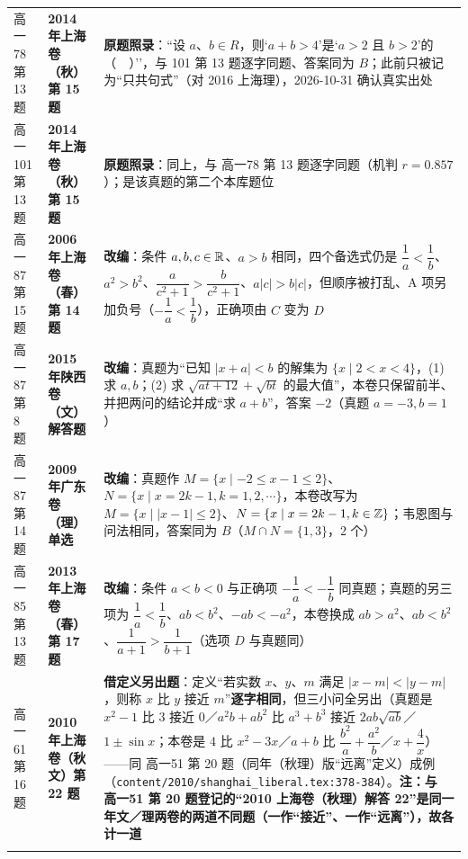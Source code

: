 \documentclass[a4paper,11pt]{article}
\begin{document}
\begin{xltabular}{\textwidth}{@{}>{\raggedright\arraybackslash}p{2.85cm}>{\raggedright\arraybackslash}p{3.99cm}>{\raggedright\arraybackslash}p{7.89cm}@{}}
高一78 第 13 题 & \textbf{2014 年上海卷（秋）第 15 题} & \textbf{原题照录}：``设 \(a\)、\(b\in R\)，则`\(a+b>4\)'是`\(a>2\) 且 \(b>2\)'的（　）''，与 101 第 13 题逐字同题、答案同为 \(B\)；此前只被记为``只共句式''（对 2016 上海理），2026-10-31 确认真实出处 \\ \addlinespace[1pt]
高一101 第 13 题 & \textbf{2014 年上海卷（秋）第 15 题} & \textbf{原题照录}：同上，与 高一78 第 13 题逐字同题（机判 \(r=\allowbreak 0.857\)）；是该真题的第二个本库题位 \\ \addlinespace[1pt]
高一87 第 15 题 & \textbf{2006 年上海卷（春）第 14 题} & \textbf{改编}：条件 \(a,b,c\in\mathbb{R}\)、\(a>b\) 相同，四个备选式仍是 \(\dfrac1a<\dfrac1b\)、\(a^2>b^2\)、\(\dfrac a{c^2+\allowbreak 1}>\dfrac b{c^2+\allowbreak 1}\)、\(a\lvert c\rvert>b\lvert c\rvert\)，但顺序被打乱、A 项另加负号（\(-\dfrac1a<\dfrac1b\)），正确项由 \(C\) 变为 \(D\) \\ \addlinespace[1pt]
高一87 第 8 题 & \textbf{2015 年陕西卷（文）解答题} & \textbf{改编}：真题为``已知 \(\lvert x+a\rvert<b\) 的解集为 \(\{x\mid\allowbreak 2<x<4\}\)，(1) 求 \(a,b\)；(2) 求 \(\sqrt{at+\allowbreak 12}+\allowbreak \sqrt{bt}\) 的最大值''，本卷只保留前半、并把两问的结论并成``求 \(a+b\)''，答案 \(-2\)（真题 \(a=\allowbreak -3,b=\allowbreak 1\)） \\ \addlinespace[1pt]
高一87 第 14 题 & \textbf{2009 年广东卷（理）单选} & \textbf{改编}：真题作 \(M=\allowbreak \{x\mid\allowbreak -2\leqslant\allowbreak  x-1\leqslant\allowbreak 2\}\)、\(N=\allowbreak \{x\mid\allowbreak  x=\allowbreak 2k-1,k=\allowbreak 1,\allowbreak 2,\allowbreak \cdots\}\)，本卷改写为 \(M=\allowbreak \{x\mid\allowbreak \lvert x-1\rvert\leqslant\allowbreak 2\}\)、\(N=\allowbreak \{x\mid\allowbreak  x=\allowbreak 2k-1,k\in\mathbb{Z}\}\)；韦恩图与问法相同，答案同为 \(B\)（\(M\cap\allowbreak  N=\allowbreak \{1,\allowbreak 3\}\)，2 个） \\ \addlinespace[1pt]
高一85 第 13 题 & \textbf{2013 年上海卷（春）第 17 题} & \textbf{改编}：条件 \(a<b<0\) 与正确项 \(-\dfrac1a<-\dfrac1b\) 同真题；真题的另三项为 \(\dfrac1a<\dfrac1b\)、\(ab<b^2\)、\(-ab<-a^2\)，本卷换成 \(ab>a^2\)、\(ab<b^2\)、\(\dfrac1{a+\allowbreak 1}>\dfrac1{b+\allowbreak 1}\)（选项 \(D\) 与真题同） \\ \addlinespace[1pt]
高一61 第 16 题 & \textbf{2010 年上海卷（秋文）第 22 题} & \textbf{借定义另出题}：定义``若实数 \(x\)、\(y\)、\(m\) 满足 \(\lvert x-m\rvert<\lvert y-m\rvert\)，则称 \(x\) 比 \(y\) 接近 \(m\)''\textbf{逐字相同}，但三小问全另出（真题是 \(x^2-1\) 比 \(3\) 接近 \(0\)／\(a^2b+ab^2\) 比 \(a^3+b^3\) 接近 \(2ab\sqrt{ab}\)／\(1\pm\sin x\)；本卷是 \(4\) 比 \(x^2-3x\)／\(a+b\) 比 \(\dfrac{b^2}a+\allowbreak \dfrac{a^2}b\)／\(x+\allowbreak \dfrac4x\)）------同 高一51 第 20 题（同年（秋理）版``远离''定义）成例（\texttt{content/\allowbreak{}2010/\allowbreak{}shanghai\_liberal.tex:378-\allowbreak{}384}）。\textbf{注：与 高一51 第 20 题登记的``2010 上海卷（秋理）解答 22''是同一年文／理两卷的两道不同题（一作``接近''、一作``远离''），故各计一道} \\ \addlinespace[1pt]

\end{xltabular}
\end{document}
